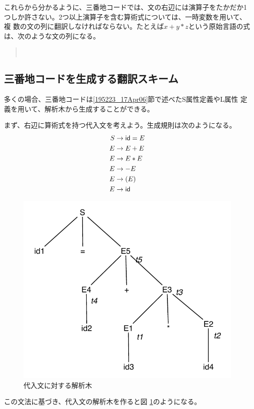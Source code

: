 これらから分かるように、三番地コードでは、文の右辺には演算子をたかだか1
つしか許さない。2つ以上演算子を含む算術式については、一時変数を用いて、複
数の文の列に翻訳しなければならない。たとえば$x + y * z$という原始言語の式
は、次のような文の列になる。
\begin{quote}
  \\
\end{quote}

\subsection{三番地コードを生成する翻訳スキーム}

多くの場合、三番地コードは\ref{195223_17Apr06}節で述べたS属性定義やL属性
定義を用いて、解析木から生成することができる。

まず、右辺に算術式を持つ代入文を考えよう。生成規則は次のようになる。
\begin{align*}
 S & \rightarrow {\sf id} = E \\
 E & \rightarrow E + E \\
 E & \rightarrow E \ast E \\
 E & \rightarrow - E \\
 E & \rightarrow ( E ) \\
 E & \rightarrow {\sf id}
\end{align*}
\begin{figure}
 \begin{center}
  \includegraphics{figure/parse_tree_substitution.pdf}
 \end{center}
 \caption{代入文に対する解析木}
 \label{142215_18Apr06}
\end{figure}
この文法に基づき、代入文の解析木を作ると図
\ref{142215_18Apr06}のようになる。

